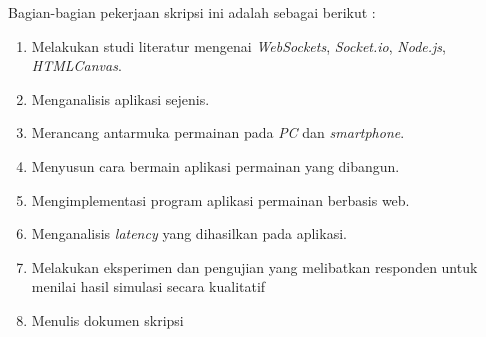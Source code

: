 \documentclass[a4paper,twoside]{article}
\begin{document}
Bagian-bagian pekerjaan skripsi ini adalah sebagai berikut :
	\begin{enumerate}
		\item Melakukan studi literatur mengenai \textit{WebSockets}, \textit{Socket.io}, \textit{Node.js}, \textit{HTMLCanvas}.
		\item Menganalisis aplikasi sejenis.
		\item Merancang antarmuka permainan pada \textit{PC} dan \textit{smartphone}.
		\item Menyusun cara bermain aplikasi permainan yang dibangun.
		\item Mengimplementasi program aplikasi permainan berbasis web.
		\item Menganalisis \textit{latency} yang dihasilkan pada aplikasi.
		\item Melakukan eksperimen dan pengujian yang melibatkan responden untuk menilai hasil simulasi secara kualitatif
		\item Menulis dokumen skripsi
	\end{enumerate}
\end{document}
